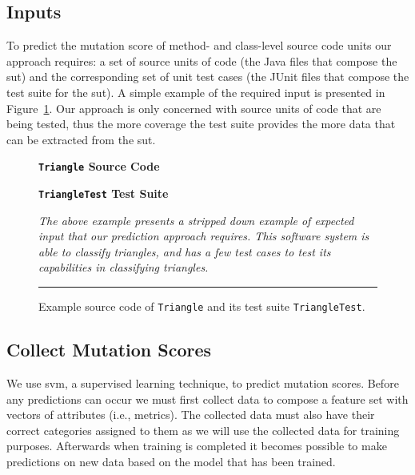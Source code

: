 \subsection{Inputs}
\label{subsec:approach_inputs}
To predict the mutation score of method- and class-level source code units our approach requires: a set of source units of code (the Java files that compose the \gls{sut}) and the corresponding set of unit test cases (the JUnit files that compose the test suite for the \gls{sut}). A simple example of the required input is presented in Figure~\ref{fig:triangle_example}. Our approach is only concerned with source units of code that are being tested, thus the more coverage the test suite provides the more data that can be extracted from the \gls{sut}.

\begin{figure}[!tb]
  \centering
  \begin{minipage}[t]{7.25cm}
  \centering
  \footnotesize{\textbf{\texttt{Triangle} Source Code}}
  
  \end{minipage}
  \hfill
  \begin{minipage}[t]{7.25cm}
  \centering
  \footnotesize{\textbf{\texttt{TriangleTest} Test Suite}}
  
  \end{minipage}
  \caption{Example source code of \texttt{Triangle} and its test suite \texttt{TriangleTest}.}
  \vspace{1mm}
  \footnotesize{\emph{The above example presents a stripped down example of expected input that our prediction approach requires. This software system is able to classify triangles, and has a few test cases to test its capabilities in classifying triangles.}}
  \vspace{2mm}
  \hrule
  \label{fig:triangle_example}
\end{figure}


\subsection{Collect Mutation Scores}
\label{subsec:approach_collect_mutation_scores}
We use \gls{svm}, a supervised learning technique, to predict mutation scores. Before any predictions can occur we must first collect data to compose a feature set with vectors of attributes (i.e., metrics). The collected data must also have their correct categories assigned to them as we will use the collected data for training purposes. Afterwards when training is completed it becomes possible to make predictions on new data based on the model that has been trained.

